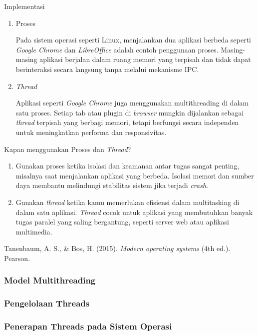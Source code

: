 \documentclass[12pt]{article}
\begin{document}
\item Implementasi
      \begin{enumerate}
          \item Proses

                Pada sistem operasi seperti Linux, menjalankan dua aplikasi berbeda seperti \textit{Google Chrome} dan \textit{LibreOffice} adalah contoh penggunaan proses. Masing-masing aplikasi berjalan dalam ruang memori yang terpisah dan tidak dapat berinteraksi secara langsung tanpa melalui mekanisme IPC.
          \item \textit{Thread}

                Aplikasi seperti \textit{Google Chrome} juga menggunakan multithreading di dalam satu proses. Setiap tab atau plugin di \textit{browser} mungkin dijalankan sebagai \textit{thread} terpisah yang berbagi memori, tetapi berfungsi secara independen untuk meningkatkan performa dan responsivitas.
      \end{enumerate}
\item Kapan menggunakan Proses dan \textit{Thread}?
      \begin{enumerate}
          \item Gunakan proses ketika isolasi dan keamanan antar tugas sangat penting, misalnya saat menjalankan aplikasi yang berbeda. Isolasi memori dan sumber daya membantu melindungi stabilitas sistem jika terjadi \textit{crash}.
          \item Gunakan \textit{thread} ketika kamu memerlukan efisiensi dalam multitasking di dalam satu aplikasi. \textit{Thread} cocok untuk aplikasi yang membutuhkan banyak tugas paralel yang saling bergantung, seperti server web atau aplikasi multimedia.
      \end{enumerate}

Tanenbaum, A. S., \& Bos, H. (2015). \textit{Modern operating systems} (4th ed.). Pearson.

\subsubsection{Model Multithreading}
\subsubsection{Pengelolaan Threads}
\subsubsection{Penerapan Threads pada Sistem Operasi}
\end{document}

